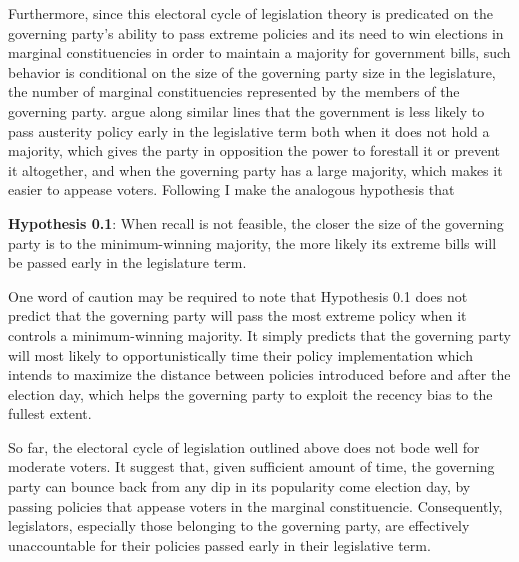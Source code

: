 \documentclass{article}
\begin{document}
		Furthermore,
		since
		this electoral cycle of legislation theory is predicated on
		the governing party's ability to pass extreme policies
		and its need to win elections
		in marginal constituencies
		in order to maintain a majority for government bills,
		such behavior is conditional on
		the size of the governing party size in the legislature,
		the number of marginal constituencies
		represented by the members of the governing party.
		\citeauthor{stroblElectoralCyclesGovernment2021}
		\autocite*{stroblElectoralCyclesGovernment2021}
		argue along similar lines that the government is less likely to pass austerity policy
		early in the legislative term
		both when it does not hold a majority,
		which gives the party in opposition the
		power to forestall it or prevent it altogether,
		and when the governing party has a large majority,
		which makes it easier to appease voters.
		Following
		I make the analogous hypothesis that
		
		\textbf{Hypothesis 0.1}: When recall is not feasible,
		the closer the size of the governing party is to the minimum-winning majority,
		the more likely its extreme bills will be passed early in the legislature term.
		
		One word of caution may be required
		to note that
		Hypothesis 0.1 does not predict that
		the governing party will pass the most extreme policy
		when it controls a minimum-winning majority.
		It simply predicts that
		the governing party will most likely to opportunistically
		time their policy implementation
		which intends to maximize the distance between
		policies introduced before and after the election day,
		which helps the governing party to exploit the recency bias
		to the fullest extent.
		
		So far, the electoral cycle of legislation outlined above
		does not bode well for moderate voters.
		It suggest that,
		given sufficient amount of time,
		the governing party can bounce back from
		any dip in its popularity come election day,
		by passing policies that appease voters in the marginal constituencie.
		Consequently,
		legislators, especially those belonging to the governing party,
		are effectively unaccountable for their policies
		passed early in their legislative term.
		
		
\end{document}
